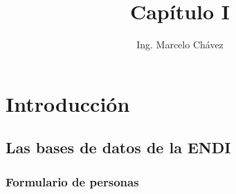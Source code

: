 \documentclass[
  letterpaper,
  DIV=11,
  numbers=noendperiod]{scrreprt}
\title{Capítulo I}
\author{Ing. Marcelo Chávez}
\date{}
\renewcommand*\contentsname{Table of contents}
\newcommand\contentsname{Table of contents}
\begin{document}
\maketitle

\renewcommand*\contentsname{\textbf{CONTENIDOS}}
{
\hypersetup{linkcolor=green}
\setcounter{tocdepth}{2}
\tableofcontents
}
\chapter{Introducción}\label{introducciuxf3n}

\section{Las bases de datos de la
ENDI}\label{las-bases-de-datos-de-la-endi}

\subsection{Formulario de personas}\label{formulario-de-personas}
\end{document}
